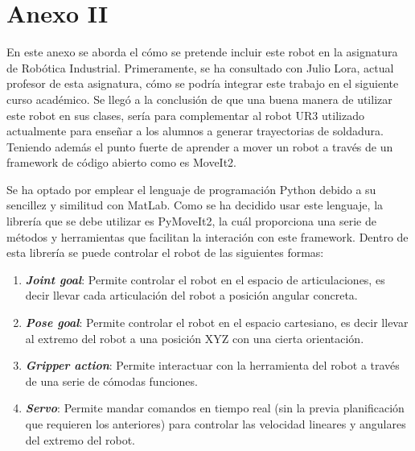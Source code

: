 \chapter*{Anexo II}
\label{cap:anexoii}

\noindent En este anexo se aborda el cómo se pretende incluir este robot en la asignatura de Robótica Industrial. Primeramente, 
se ha consultado con Julio Lora, actual profesor de esta asignatura, cómo se podría integrar este trabajo en el siguiente curso académico. Se llegó 
a la conclusión de que una buena manera de utilizar este robot en sus clases, sería para complementar al robot UR3 utilizado actualmente 
para enseñar a los alumnos a generar trayectorias de soldadura. Teniendo además el punto fuerte de aprender a mover un robot a través de un framework 
de código abierto como es MoveIt2.  
  


Se ha optado por emplear el lenguaje de programación Python debido a su sencillez y similitud con MatLab. Como se ha decidido usar este lenguaje, 
la librería que se debe utilizar es PyMoveIt2, la cuál proporciona una serie de métodos y herramientas que 
facilitan la interación con este framework. Dentro de esta librería se puede controlar el robot de las siguientes formas:
\begin{enumerate}
\item \textbf{\textit{Joint goal}}: Permite controlar el robot en el espacio de articulaciones, es decir llevar cada articulación del robot a posición angular concreta.
\item \textbf{\textit{Pose goal}}: Permite controlar el robot en el espacio cartesiano, es decir llevar al extremo del robot a una posición XYZ con una 
cierta orientación.
\item \textbf{\textit{Gripper action}}: Permite interactuar con la herramienta del robot a través de una serie de cómodas funciones.
\item \textbf{\textit{Servo}}: Permite mandar comandos en tiempo real (sin la previa planificación que requieren los anteriores) para controlar las velocidad lineares y 
angulares del extremo del robot.

\end{enumerate}

